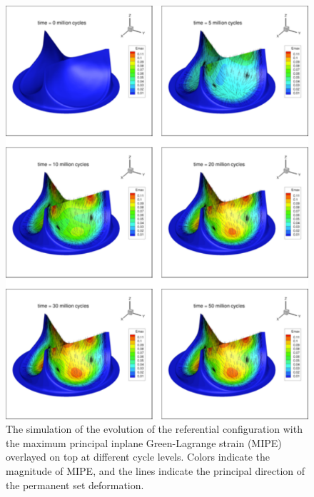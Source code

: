     
\begin{figure}
\centering
\includegraphics[width=5in]{Images/chapter6/psdeformation.pdf}
\caption{The simulation of the evolution of the referential configuration with the maximum principal in\Hyphdash plane Green-Lagrange strain (MIPE) overlayed on top at different cycle levels. Colors indicate the magnitude of MIPE, and the lines indicate the principal direction of the permanent set deformation.}
\label{c6:fig:psdeformation}
\end{figure}

